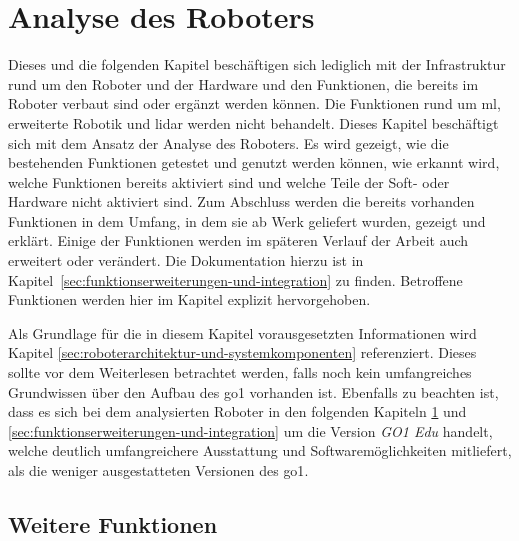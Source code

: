 \section{Analyse des Roboters}
\label{sec:analyse-des-roboters}

Dieses und die folgenden Kapitel beschäftigen sich lediglich mit der Infrastruktur rund um den Roboter
und der Hardware und den Funktionen, die bereits im Roboter verbaut sind oder ergänzt werden können.
Die Funktionen rund um \gls{ml}, erweiterte Robotik und \gls{lidar} werden nicht behandelt.
Dieses Kapitel beschäftigt sich mit dem Ansatz der Analyse des Roboters.
Es wird gezeigt, wie die bestehenden Funktionen getestet und genutzt werden können, wie erkannt wird,
welche Funktionen bereits aktiviert sind und welche Teile der Soft- oder Hardware nicht aktiviert sind.
Zum Abschluss werden die bereits vorhanden Funktionen in dem Umfang, in dem sie ab Werk geliefert wurden,
gezeigt und erklärt.
Einige der Funktionen werden im späteren Verlauf der Arbeit auch erweitert oder verändert.
Die Dokumentation hierzu ist in Kapitel~\ref{sec:funktionserweiterungen-und-integration} zu finden.
Betroffene Funktionen werden hier im Kapitel explizit hervorgehoben.

Als Grundlage für die in diesem Kapitel vorausgesetzten Informationen wird Kapitel \ref{sec:roboterarchitektur-und-systemkomponenten}
referenziert.
Dieses sollte vor dem Weiterlesen betrachtet werden, falls noch kein umfangreiches Grundwissen über den Aufbau des \gls{go1}
vorhanden ist.
Ebenfalls zu beachten ist, dass es sich bei dem analysierten Roboter in den folgenden Kapiteln \ref{sec:analyse-des-roboters}
und \ref{sec:funktionserweiterungen-und-integration} um die Version \emph{GO1 Edu} handelt, welche deutlich umfangreichere
Ausstattung und Softwaremöglichkeiten mitliefert, als die weniger ausgestatteten Versionen des \gls{go1}.












\subsection{Weitere Funktionen}
\label{subsec:weitere-funktionen} %